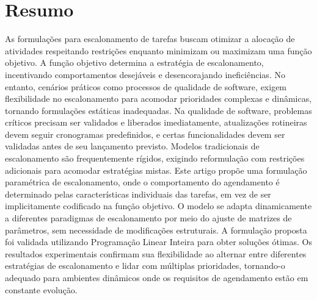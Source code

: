 \documentclass[12pt]{article}
\begin{document}

\section*{Resumo}

As formulações para escalonamento de tarefas buscam otimizar a alocação de atividades respeitando restrições enquanto minimizam ou maximizam uma função objetivo. A função objetivo determina a estratégia de escalonamento, incentivando comportamentos desejáveis e desencorajando ineficiências. No entanto, cenários práticos como processos de qualidade de software, exigem flexibilidade no escalonamento para acomodar prioridades complexas e dinâmicas, tornando formulações estáticas inadequadas. Na qualidade de software, problemas críticos precisam ser validados e liberados imediatamente, atualizações rotineiras devem seguir cronogramas predefinidos, e certas funcionalidades devem ser validadas antes de seu lançamento previsto. Modelos tradicionais de escalonamento são frequentemente rígidos, exigindo reformulação com restrições adicionais para acomodar estratégias mistas. Este artigo propõe uma formulação paramétrica de escalonamento, onde o comportamento do agendamento é determinado pelas características individuais das tarefas, em vez de ser implicitamente codificado na função objetivo. O modelo se adapta dinamicamente a diferentes paradigmas de escalonamento por meio do ajuste de matrizes de parâmetros, sem necessidade de modificações estruturais. A formulação proposta foi validada utilizando Programação Linear Inteira para obter soluções ótimas. Os resultados experimentais confirmam sua flexibilidade ao alternar entre diferentes estratégias de escalonamento e lidar com múltiplas prioridades, tornando-o adequado para ambientes dinâmicos onde os requisitos de agendamento estão em constante evolução.
\end{document}
